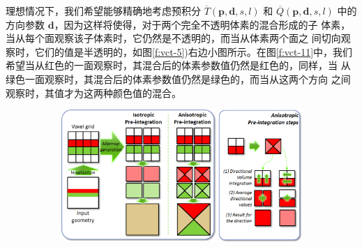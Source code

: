 理想情况下，我们希望能够精确地考虑预积分 $\overline{T}(\mathbf{p},\mathbf{d},s,l)$ 和 $\overline{Q}(\mathbf{p},\mathbf{d},s,l)$ 中的方向参数 $\mathbf{d}$，因为这样将使得，对于两个完全不透明体素的混合形成的子 体素，当从每个面观察该子体素时，它仍然是不透明的，而当从体素两个面之 间切向观察时，它们的值是半透明的，如图\ref{f:vct-5})右边小图所示。在图\ref{f:vct-11}中，我们希望当从红色的一面观察时，其混合后的体素参数值仍然是红色的，同样，当 从绿色一面观察时，其混合后的体素参数值仍然是绿色的，而当从这两个方向 之间观察时，其值才为这两种颜色值的混合。

\begin{figure}
\begin{fullwidth}
	\begin{subfigure}[b]{0.774\thewidth}
		\includegraphics[width=\textwidth]{figures/vct/vct-5-1}
	\end{subfigure}
	\begin{subfigure}[b]{0.215\thewidth}

\end{subfigure}
\end{fullwidth}
\end{figure}
